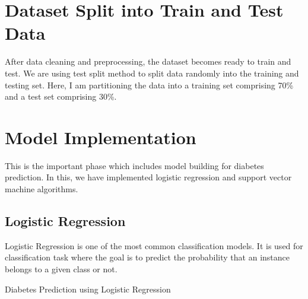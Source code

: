 \section{Dataset Split into Train and Test Data}
After data cleaning and preprocessing, the dataset becomes ready to train and test. We are using test split method to split data randomly into the training and testing set. Here, I am partitioning the data into a training set comprising 70\% and a test set comprising 30\%.

\section{Model Implementation}
This is the important phase which includes model building for diabetes prediction. In this, we have implemented logistic regression and support vector machine algorithms.

\subsection{Logistic Regression}
Logistic Regression is one of the most common classification models. It is used for classification task where the goal is to predict the probability that an instance belongs to a given class or not. 

\begin{algorithm}
    \caption{Diabetes Prediction using Logistic Regression}
    \label{algo:algo_lr}
    \begin{algorithmic}[1]
        \Statex
    \end{algorithmic}
\end{algorithm}

